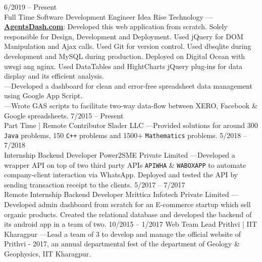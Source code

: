 \documentclass[8pt]{developercv} %
\begin{document}
\begin{entrylist}
	\entry
		{6/2019 -- Present\\\footnotesize{Full Time}}
		{Software Development Engineer}
		{Idea Rise Technology}
		{
		---\href{https://agentsdash.com}{\textbf{AgentsDash.com}}: Developed this web application from scratch. Solely responsible for Design, Development and Deployment. Used jQuery for DOM Manipulation and Ajax calls. Used Git for version control. Used dbsqlite during development and MySQL during production. Deployed on Digital Ocean with uwsgi ang nginx. Used DataTables and HightCharts jQuery plug-ins for data display and its efficient analysis.\\ ---Developed a dashboard for clean and error-free spreadsheet data management using Google App Script.\\ ---Wrote GAS scripts to facilitate two-way data-flow between XERO, Facebook \& Google spreadsheets.}
	\entry
		{7/2015 -- Present\\\footnotesize{Part Time | Remote}}
		{Contributor}
		{Slader LLC}
		{---Provided solutions for around 300 \texttt{Java} problems, 150 \texttt{C++} problems and 1500+ \texttt{Mathematics} problems.}
	\entry
		{5/2018 -- 7/2018\\\footnotesize{Internship}}
		{Backend Developer}
		{Power2SME Private Limited}
		{---Developed a wrapper API on top of two third party APIs \texttt{APIWHA} \& \texttt{WABOXAPP} to automate company-client interaction via WhatsApp. Deployed and tested the API by sending transaction receipt to the clients.}
	\entry
		{5/2017 -- 7/2017\\\footnotesize{Remote Internship}}
		{Backend Developer}
		{Mrittica Infotech Private Limited}
		{---Developed admin dashboard from scratch for an E-commerce startup which sell organic products. Created the relational database and developed the backend of its android app in a team of two.}
	\entry
		{10/2015 -- 1/2017}
		{Web Team Lead}
		{Prithvi | IIT Kharagpur}
		{---Lead a team of 3 to develop and manage the official website of Prithvi - 2017, an annual departmental fest of the department of Geology \& Geophysics, IIT Kharagpur.}
\end{entrylist}
\end{document}
